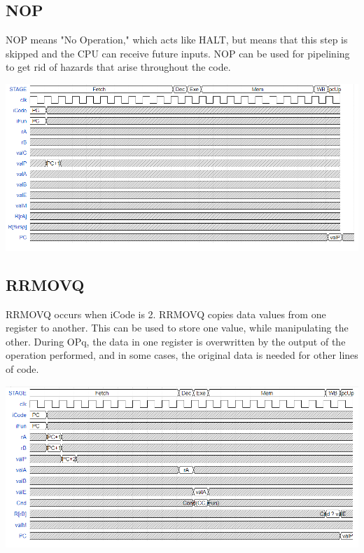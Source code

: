 \documentclass{article}
\begin{document}
\subsection{NOP}
NOP means "No Operation," which acts like HALT, but means that this step is skipped and the CPU can receive future inputs. NOP can be used for pipelining to get rid of hazards that arise throughout the code. 
\begin{center}
    \includegraphics[scale=.6]{NOPpic.png}
\end{center}
\pagebreak
\subsection{RRMOVQ}
RRMOVQ occurs when iCode is 2. RRMOVQ copies data values from one register to another. This can be used to store one value, while manipulating the other. During OPq, the data in one register is overwritten by the output of the operation performed, and in some cases, the original data is needed for other lines of code.
\begin{center}
    \includegraphics[scale=.6]{CMOVpic.png}
\end{center}
\end{document}
